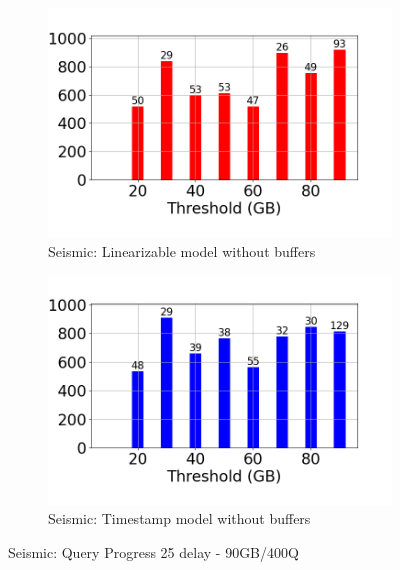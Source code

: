 \begin{figure}
\begin{subfigure}[c]{0.48\textwidth}
		\includegraphics[width=1\textwidth]	 {figures/Experiments/Dynamic/SEISMIC/25/average_query_time_per_batch_version_999777016_10485760_10_delay[25].png}
		\caption{Seismic: Linearizable model without buffers}
		\label{fig:logical-ts-no-25-seismic}
	\end{subfigure}
	\begin{subfigure}[c]{0.48\textwidth}
		\includegraphics[width=1\textwidth]	 {figures/Experiments/Dynamic/SEISMIC/25/average_query_time_per_batch_version_999777017_10485760_10_delay[25].png}
		\caption{Seismic: Timestamp model without buffers}
		\label{fig:system-ts-no-25-seismic}
	\end{subfigure}
	\caption{Seismic: Query Progress 25 delay - 90GB/400Q}
	\label{fig:query-progress-25-seismic}
\end{figure}
